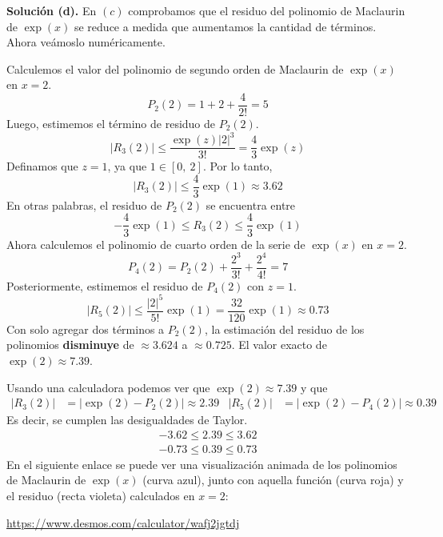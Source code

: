\documentclass[12pt]{article}
\begin{document}
\textbf{Solución (d).} En $(c)$ comprobamos que el residuo del polinomio de Maclaurin de $\exp(x)$ se reduce a medida que aumentamos la cantidad de términos. Ahora veámoslo numéricamente.

Calculemos el valor del polinomio de segundo orden de Maclaurin de $\exp(x)$ en $x = 2$.
\[
  P_{2}(2) = 1 + 2 + \frac{4}{2!} = 5
\]
Luego, estimemos el término de residuo de $P_{2}(2)$.
\[
  |R_{3}(2)| \leq \frac{\exp(z)|2|^{3}}{3!}
            = \frac{4}{3} \exp(z)
\]
Definamos que $z = 1$, ya que $1 \in [0, \ 2]$. Por lo tanto,
\[
  |R_{3}(2)| \leq \frac{4}{3} \exp(1) \approx 3.62
\]
En otras palabras, el residuo de $P_{2}(2)$ se encuentra entre
\[
  -\frac{4}{3} \exp(1) \leq R_{3}(2) \leq \frac{4}{3} \exp(1)
\]
Ahora calculemos el polinomio de cuarto orden de la serie de $\exp(x)$ en $x = 2$.
\[
  P_{4}(2) = P_{2}(2) + \frac{2^{3}}{3!} + \frac{2^{4}}{4!} = 7
\]
Posteriormente, estimemos el residuo de $P_{4}(2)$ con $z = 1$.
\[
  |R_{5}(2)| \leq \frac{|2|^{5}}{5!} \exp(1)
             = \frac{32}{120} \exp(1)
             \approx 0.73
\]
Con solo agregar dos términos a $P_{2}(2)$, la estimación del residuo de los polinomios \textbf{disminuye} de $\approx 3.624$ a $\approx 0.725$. El valor exacto de $\exp(2) \approx 7.39$.

Usando una calculadora podemos ver que $\exp(2) \approx 7.39$ y que
\begin{align*}
|R_{3}(2)| &= |\exp(2) - P_{2}(2)| \approx 2.39 &
|R_{5}(2)| &= |\exp(2) - P_{4}(2)| \approx 0.39
\end{align*}
Es decir, se cumplen las desigualdades de Taylor.
\begin{align*}
-3.62 \leq 2.39 \leq 3.62 \\
-0.73 \leq 0.39 \leq 0.73
\end{align*}
En el siguiente enlace se puede ver una visualización animada de los polinomios de Maclaurin de $\exp(x)$ (curva azul), junto con aquella función (curva roja) y el residuo (recta violeta) calculados en $x = 2$:

\begin{center}
\url{https://www.desmos.com/calculator/wafj2jgtdj}
\end{center}
\end{document}
